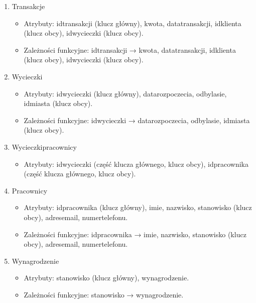 \documentclass{article}
\begin{document}
\begin{enumerate}
		\item Transakcje
		\begin{itemize}
			\item Atrybuty: id\textunderscore transakcji (klucz główny), kwota, data\textunderscore transakcji, id\textunderscore klienta (klucz obcy), id\textunderscore wycieczki (klucz obcy).
			\item Zależności funkcyjne: id\textunderscore transakcji → kwota, data\textunderscore transakcji, id\textunderscore klienta (klucz obcy), id\textunderscore wycieczki (klucz obcy).
		\end{itemize}
		
		\item Wycieczki
		\begin{itemize}
			\item Atrybuty: id\textunderscore wycieczki (klucz główny), data\textunderscore rozpoczecia, odbyla\textunderscore sie, id\textunderscore miasta (klucz obcy).
			\item Zależności funkcyjne: id\textunderscore wycieczki → data\textunderscore rozpoczecia, odbyla\textunderscore sie, id\textunderscore miasta (klucz obcy).
		\end{itemize}
		
		\item Wycieczki\textunderscore pracownicy
		\begin{itemize}
			\item Atrybuty: id\textunderscore wycieczki (część klucza głównego, klucz obcy), id\textunderscore pracownika (część klucza głównego, klucz obcy).
		\end{itemize}
		
		\item Pracownicy
		\begin{itemize}
			\item Atrybuty: id\textunderscore pracownika (klucz główny), imie, nazwisko, stanowisko (klucz obcy), adres\textunderscore email, numer\textunderscore telefonu.
			\item Zależności funkcyjne: id\textunderscore pracownika → imie, nazwisko, stanowisko (klucz obcy), adres\textunderscore email, numer\textunderscore telefonu.
		\end{itemize}
		
		\item Wynagrodzenie
		\begin{itemize}
			\item Atrybuty: stanowisko (klucz główny), wynagrodzenie.
			\item Zależności funkcyjne: stanowisko → wynagrodzenie.
		\end{itemize}
	\end{enumerate}
	
\end{document}

